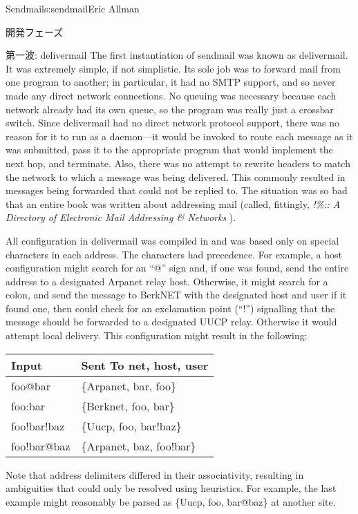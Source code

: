 \begin{aosachapter}{Sendmail}{s:sendmail}{Eric Allman}
\begin{aosasect1}{開発フェーズ}
\begin{aosasect2}{第一波: delivermail}
The first instantiation of sendmail was known as delivermail. It was
extremely simple, if not simplistic. Its sole job was to forward mail
from one program to another; in particular, it had no SMTP support,
and so never made any direct network connections. No queuing
was necessary because each network already had its own queue, so the
program was really just a crossbar switch. Since delivermail had no
direct network protocol support, there was no reason for it to run as
a daemon---it would be invoked to route each message as it was
submitted, pass it to the appropriate program that would implement the
next hop, and terminate.  Also, there was no attempt to rewrite
headers to match the network to which a message was being
delivered. This commonly resulted in messages being forwarded that
could not be replied to. The situation was so bad that an entire book
was written about addressing mail (called, fittingly,
\emph{!\%\@:: A Directory of Electronic Mail Addressing \& Networks}
\cite{bib:adams:email}).

All configuration in delivermail was compiled in and was based only on
special characters in each address.  The characters had
precedence. For example, a host configuration might search for an
``@'' sign and, if one was found, send the entire address to a
designated Arpanet relay host. Otherwise, it might search for a colon,
and send the message to BerkNET with the designated host and user if
it found one, then could check for an exclamation point (``!'')
signalling that the message should be forwarded to a designated UUCP
relay.  Otherwise it would attempt local delivery. This configuration
might result in the following:

\begin{table}[h!]\centering
\begin{tabular}{|ll|}
\hline
Input & Sent To {net, host, user} \\
\hline
foo@bar & \{Arpanet, bar, foo\} \\
foo:bar & \{Berknet, foo, bar\} \\
foo!bar!baz & \{Uucp, foo, bar!baz\} \\
foo!bar@baz & \{Arpanet, baz, foo!bar\} \\
\hline
\end{tabular}
\end{table}

\noindent
Note that address delimiters differed in their associativity,
resulting in ambiguities that could only be resolved using heuristics.
For example, the last example might reasonably be parsed as
\{Uucp, foo, bar@baz\} 
at another site.


\end{aosasect2}
\end{aosasect1}
\end{aosachapter}
